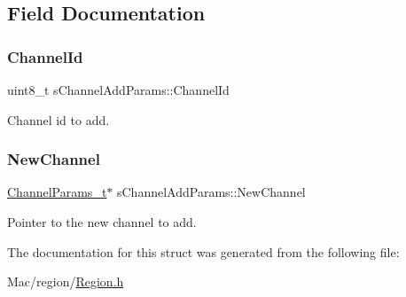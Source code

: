 \subsection{Field Documentation}
\mbox{\label{structsChannelAddParams_a5f26cba04f1453e2b6db2ab73389238b}} 
\subsubsection{\texorpdfstring{Channel\+Id}{ChannelId}}
{\footnotesize\ttfamily uint8\+\_\+t s\+Channel\+Add\+Params\+::\+Channel\+Id}

Channel id to add. \mbox{\label{structsChannelAddParams_a137bee029b5796735c1689c969413e63}} 
\subsubsection{\texorpdfstring{New\+Channel}{NewChannel}}
{\footnotesize\ttfamily \hyperlink{group__LORAMAC_ga1360ca6f82c6d125ea43a9dad9b56184}{Channel\+Params\+\_\+t}$\ast$ s\+Channel\+Add\+Params\+::\+New\+Channel}

Pointer to the new channel to add. 

The documentation for this struct was generated from the following file\+:\begin{DoxyCompactItemize}
\item 
Mac/region/\hyperlink{Region_8h}{Region.\+h}\end{DoxyCompactItemize}
